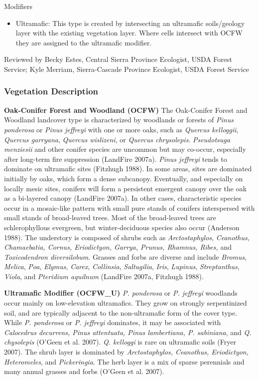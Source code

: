 Modifiers
\begin{itemize}
	\item Ultramafic: This type is created by intersecting an ultramafic soils/geology layer with the existing vegetation layer. Where cells intersect with OCFW they are assigned to the ultramafic modifier.
\end{itemize}

\noindent Reviewed by Becky Estes, Central Sierra Province Ecologist, USDA Forest Service; Kyle Merriam, Sierra-Cascade Province Ecologist, USDA Forest Service


\subsubsection*{Vegetation Description}
\textbf{Oak-Conifer Forest and Woodland (OCFW)} The Oak-Conifer Forest and Woodland landcover type is characterized by woodlands or forests of \emph{Pinus ponderosa} or \emph{Pinus jeffreyi} with one or more oaks, such as \emph{Quercus kelloggii}, \emph{Quercus garryana}, \emph{Quercus wislizeni}, or \emph{Quercus chrysolepis}. \emph{Pseudotsuga menziesii} and other conifer species are uncommon but may co-occur, especially after long-term fire suppression (LandFire 2007a). \emph{Pinus jeffreyi} tends to dominate on ultramafic sites (Fitzhugh 1988). In some areas, sites are dominated initially by oaks, which form a dense subcanopy. Eventually, and especially on locally mesic sites, conifers will form a persistent emergent canopy over the oak as a bi-layered canopy (LandFire 2007a). In other cases, characteristic species occur in a mosaic-like pattern with small pure stands of conifers interspersed with small stands of broad-leaved trees. Most of the broad-leaved trees are schlerophyllous evergreen, but winter-deciduous species also occur (Anderson 1988). The understory is composed of shrubs such as \emph{Arctostaphylos}, \emph{Ceanothus, Chamaebatia, Cornus, Eriodictyon, Garrya, Prunus, Rhamnus, Ribes,} and \emph{Toxicodendron diversilobum}. Grasses and forbs are diverse and include \emph{Bromus}, \emph{Melica}, \emph{Poa}, \emph{Elymus}, \emph{Carex}, \emph{Collinsia}, \emph{Saltugilia}, \emph{Iris}, \emph{Lupinus}, \emph{Streptanthus}, \emph{Viola}, and \emph{Pteridium aquilnum} (LandFire 2007a, Fitzhugh 1988).

\begin{adjustwidth}{2cm}{}

\textbf{Ultramafic Modifier (OCFW\_U)}  \emph{P. ponderosa} or \emph{P. jeffreyi} woodlands occur mainly on low-elevation ultramafics. They grow on strongly serpentinized soil, and are typically adjacent to the non-ultramafic form of the cover type. While \emph{P. ponderosa} or \emph{P. jeffreyi} dominates, it may be associated with \emph{Calocedrus decurrens, Pinus attentuata, Pinus lambertiana, P. sabiniana}, and \emph{Q. chysolepis} (O'Geen et al. 2007). \emph{Q. kelloggi} is rare on ultramafic soils (Fryer 2007). The shrub layer is dominated by \emph{Arctostaphylos, Ceanothus, Eriodictyon, Heteromeles}, and \emph{Pickeringia}. The herb layer is a mix of sparse perennials and many annual grasses and forbs (O'Geen et al. 2007). 

\end{adjustwidth}


